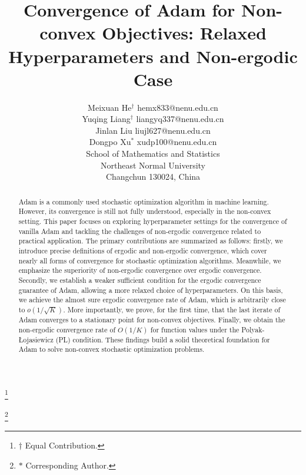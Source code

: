 \documentclass[twoside,11pt]{article}
\newcommand\blfootnote[1]{%
	\begingroup
	\renewcommand\thefootnote{}\footnote{#1}%
	\addtocounter{footnote}{-1}%
	\endgroup
}
\begin{document}
\title{Convergence of Adam for Non-convex Objectives: Relaxed Hyperparameters and Non-ergodic Case}

\author{\name Meixuan He$^{\dagger}$ 
	\email hemx833@nenu.edu.cn\\
	\name Yuqing Liang$^{\dagger}$ 
	\email liangyq337@nenu.edu.cn
	\\
	\name Jinlan Liu 
	\email liujl627@nenu.edu.cn\\
	\name Dongpo Xu$^{\ast}$
	\email xudp100@nenu.edu.cn\\
	\addr School of Mathematics and Statistics\\
	Northeast Normal University\\
	Changchun 130024, China}

\blfootnote{$\dagger$ Equal Contribution.}
\blfootnote{ $\ast$ Corresponding Author.}
\maketitle

\begin{abstract}%
Adam is a commonly used stochastic optimization algorithm in machine learning. However, its convergence is still not fully understood, especially in the non-convex setting. This paper focuses on exploring hyperparameter settings for the convergence of vanilla Adam and tackling the challenges of non-ergodic convergence related to practical application. The primary contributions are summarized as follows: firstly, we introduce precise definitions of ergodic and non-ergodic convergence, which cover nearly all forms of convergence for stochastic optimization algorithms. Meanwhile, we emphasize the superiority of non-ergodic convergence over ergodic convergence. Secondly, we establish a weaker sufficient condition for the ergodic convergence guarantee of Adam, allowing a more relaxed choice of hyperparameters. On this basis, we achieve the almost sure ergodic convergence rate of Adam, which is arbitrarily close to $o(1/\sqrt{K})$. More importantly, we prove, for the first time, that the last iterate of Adam converges to a stationary point for non-convex objectives. Finally, we obtain the non-ergodic convergence rate of $O(1/K)$ for function values under the Polyak-\L ojasiewicz (PL) condition. These findings build a solid theoretical foundation for Adam to solve non-convex stochastic optimization problems.
\end{abstract}
\end{document}
